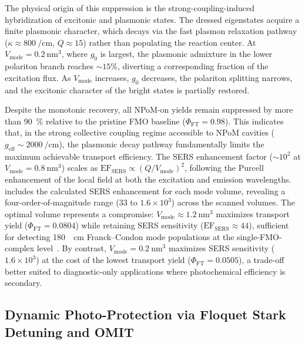 \documentclass[12pt]{article}
\begin{document}
The physical origin of this suppression is the strong-coupling-induced hybridization of excitonic and plasmonic states.
The dressed eigenstates acquire a finite plasmonic character, which decays via the fast plasmon relaxation pathway ($\kappa \approx \SI{800}{\per\cm}$, $Q \approx 15$) rather than populating the reaction center.
At $V_{\mathrm{mode}} = \SI{0.2}{\nm\cubed}$, where $g_0$ is largest, the plasmonic admixture in the lower polariton branch reaches $\sim 15\%$, diverting a corresponding fraction of the excitation flux.
As $V_{\mathrm{mode}}$ increases, $g_0$ decreases, the polariton splitting narrows, and the excitonic character of the bright states is partially restored.

Despite the monotonic recovery, all NPoM-on yields remain suppressed by more than \SI{90}{\percent} relative to the pristine FMO baseline ($\Phi_{\mathrm{FT}} = 0.98$).
This indicates that, in the strong collective coupling regime accessible to NPoM cavities ($g_{\mathrm{eff}} \sim \SI{2000}{\per\cm}$), the plasmonic decay pathway fundamentally limits the maximum achievable transport efficiency.
The SERS enhancement factor ($\sim 10^2$ at $V_{\mathrm{mode}} = \SI{0.8}{\nm\cubed}$) scales as $\mathrm{EF}_{\mathrm{SERS}} \propto (Q/V_{\mathrm{mode}})^2$, following the Purcell enhancement of the local field at both the excitation and emission wavelengths.
 includes the calculated SERS enhancement for each mode volume, revealing a four-order-of-magnitude range ($33$ to $1.6\times10^3$) across the scanned volumes.
The optimal volume represents a compromise: $V_{\mathrm{mode}} \approx \SI{1.2}{\nm\cubed}$ maximizes transport yield ($\Phi_{\mathrm{FT}} = 0.0804$) while retaining SERS sensitivity ($\mathrm{EF}_{\mathrm{SERS}} \approx 44$), sufficient for detecting \SI{180}{\per\cm} Franck--Condon mode populations at the single-FMO-complex level~\cite{CiallaMay2024}.
By contrast, $V_{\mathrm{mode}} = \SI{0.2}{\nm\cubed}$ maximizes SERS sensitivity ($1.6\times10^3$) at the cost of the lowest transport yield ($\Phi_{\mathrm{FT}} = 0.0505$), a trade-off better suited to diagnostic-only applications where photochemical efficiency is secondary.

\subsection*{Dynamic Photo-Protection via Floquet Stark Detuning and OMIT}
\end{document}
